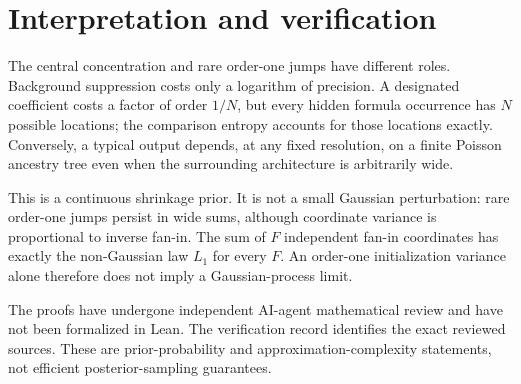 \documentclass[11pt]{article}
\begin{document}








\section{Interpretation and verification}
The central concentration and rare order-one jumps have different roles. Background suppression costs only a logarithm of precision. A designated coefficient costs a factor of order $1/N$, but every hidden formula occurrence has $N$ possible locations; the comparison entropy accounts for those locations exactly. Conversely, a typical output depends, at any fixed resolution, on a finite Poisson ancestry tree even when the surrounding architecture is arbitrarily wide.

This is a continuous shrinkage prior. It is not a small Gaussian perturbation: rare order-one jumps persist in wide sums, although coordinate variance is proportional to inverse fan-in. The sum of $F$ independent fan-in coordinates has exactly the non-Gaussian law $L_1$ for every $F$. An order-one initialization variance alone therefore does not imply a Gaussian-process limit.

The proofs have undergone independent AI-agent mathematical review and have not been formalized in Lean. The verification record identifies the exact reviewed sources. These are prior-probability and approximation-complexity statements, not efficient posterior-sampling guarantees.
\end{document}
